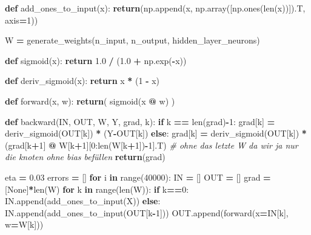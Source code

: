 \documentclass[
]{book}
\newenvironment{Shaded}{\begin{snugshade}}{\end{snugshade}}
\newcommand{\BuiltInTok}[1]{#1}
\newcommand{\CommentTok}[1]{\textcolor[rgb]{0.56,0.35,0.01}{\textit{#1}}}
\newcommand{\ControlFlowTok}[1]{\textcolor[rgb]{0.13,0.29,0.53}{\textbf{#1}}}
\newcommand{\DecValTok}[1]{\textcolor[rgb]{0.00,0.00,0.81}{#1}}
\newcommand{\FloatTok}[1]{\textcolor[rgb]{0.00,0.00,0.81}{#1}}
\newcommand{\KeywordTok}[1]{\textcolor[rgb]{0.13,0.29,0.53}{\textbf{#1}}}
\newcommand{\NormalTok}[1]{#1}
\newcommand{\OperatorTok}[1]{\textcolor[rgb]{0.81,0.36,0.00}{\textbf{#1}}}
\newcommand{\VariableTok}[1]{\textcolor[rgb]{0.00,0.00,0.00}{#1}}
\begin{document}
\begin{Shaded}
\begin{Highlighting}[]
\KeywordTok{def}\NormalTok{ add\_ones\_to\_input(x):}
  \ControlFlowTok{return}\NormalTok{(np.append(x, np.array([np.ones(}\BuiltInTok{len}\NormalTok{(x))]).T, axis}\OperatorTok{=}\DecValTok{1}\NormalTok{))}


\NormalTok{W }\OperatorTok{=}\NormalTok{ generate\_weights(n\_input, n\_output, hidden\_layer\_neurons)}


\KeywordTok{def}\NormalTok{ sigmoid(x):}
  \ControlFlowTok{return} \FloatTok{1.0} \OperatorTok{/}\NormalTok{ (}\FloatTok{1.0} \OperatorTok{+}\NormalTok{ np.exp(}\OperatorTok{{-}}\NormalTok{x))}

\KeywordTok{def}\NormalTok{ deriv\_sigmoid(x):}
  \ControlFlowTok{return}\NormalTok{ x }\OperatorTok{*}\NormalTok{ (}\DecValTok{1} \OperatorTok{{-}}\NormalTok{ x)}


\KeywordTok{def}\NormalTok{ forward(x, w):}
  \ControlFlowTok{return}\NormalTok{( sigmoid(x }\OperatorTok{@}\NormalTok{ w) )}

\KeywordTok{def}\NormalTok{ backward(IN, OUT, W, Y, grad, k):}
  \ControlFlowTok{if}\NormalTok{ k }\OperatorTok{==} \BuiltInTok{len}\NormalTok{(grad)}\OperatorTok{{-}}\DecValTok{1}\NormalTok{:}
\NormalTok{    grad[k] }\OperatorTok{=}\NormalTok{ deriv\_sigmoid(OUT[k]) }\OperatorTok{*}\NormalTok{ (Y}\OperatorTok{{-}}\NormalTok{OUT[k])}
  \ControlFlowTok{else}\NormalTok{:}
\NormalTok{    grad[k] }\OperatorTok{=}\NormalTok{ deriv\_sigmoid(OUT[k]) }\OperatorTok{*}\NormalTok{(grad[k}\OperatorTok{+}\DecValTok{1}\NormalTok{] }\OperatorTok{@}\NormalTok{ W[k}\OperatorTok{+}\DecValTok{1}\NormalTok{][}\DecValTok{0}\NormalTok{:}\BuiltInTok{len}\NormalTok{(W[k}\OperatorTok{+}\DecValTok{1}\NormalTok{])}\OperatorTok{{-}}\DecValTok{1}\NormalTok{].T) }\CommentTok{\# ohne das letzte W da wir ja nur die knoten ohne bias befüllen}
  \ControlFlowTok{return}\NormalTok{(grad)}

\NormalTok{eta }\OperatorTok{=} \FloatTok{0.03}
\NormalTok{errors }\OperatorTok{=}\NormalTok{ []}
\ControlFlowTok{for}\NormalTok{ i }\KeywordTok{in} \BuiltInTok{range}\NormalTok{(}\DecValTok{40000}\NormalTok{):}
\NormalTok{  IN }\OperatorTok{=}\NormalTok{ []}
\NormalTok{  OUT }\OperatorTok{=}\NormalTok{ []}
\NormalTok{  grad }\OperatorTok{=}\NormalTok{ [}\VariableTok{None}\NormalTok{]}\OperatorTok{*}\BuiltInTok{len}\NormalTok{(W)}
  \ControlFlowTok{for}\NormalTok{ k }\KeywordTok{in} \BuiltInTok{range}\NormalTok{(}\BuiltInTok{len}\NormalTok{(W)):}
    \ControlFlowTok{if}\NormalTok{ k}\OperatorTok{==}\DecValTok{0}\NormalTok{:}
\NormalTok{      IN.append(add\_ones\_to\_input(X))}
    \ControlFlowTok{else}\NormalTok{:}
\NormalTok{      IN.append(add\_ones\_to\_input(OUT[k}\OperatorTok{{-}}\DecValTok{1}\NormalTok{]))}
\NormalTok{    OUT.append(forward(x}\OperatorTok{=}\NormalTok{IN[k], w}\OperatorTok{=}\NormalTok{W[k]))}
    

\end{Highlighting}
\end{Shaded}
\end{document}
